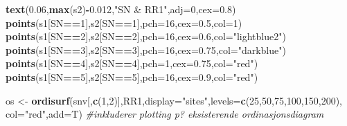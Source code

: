 \documentclass[]{article}
\newenvironment{Shaded}{\begin{snugshade}}{\end{snugshade}}
\newcommand{\CommentTok}[1]{\textcolor[rgb]{0.56,0.35,0.01}{\textit{#1}}}
\newcommand{\DataTypeTok}[1]{\textcolor[rgb]{0.13,0.29,0.53}{#1}}
\newcommand{\DecValTok}[1]{\textcolor[rgb]{0.00,0.00,0.81}{#1}}
\newcommand{\FloatTok}[1]{\textcolor[rgb]{0.00,0.00,0.81}{#1}}
\newcommand{\KeywordTok}[1]{\textcolor[rgb]{0.13,0.29,0.53}{\textbf{#1}}}
\newcommand{\NormalTok}[1]{#1}
\newcommand{\OperatorTok}[1]{\textcolor[rgb]{0.81,0.36,0.00}{\textbf{#1}}}
\newcommand{\StringTok}[1]{\textcolor[rgb]{0.31,0.60,0.02}{#1}}
\begin{document}
\begin{Shaded}
\begin{Highlighting}[]
\KeywordTok{text}\NormalTok{(}\FloatTok{0.06}\NormalTok{,}\KeywordTok{max}\NormalTok{(s2)}\OperatorTok{-}\FloatTok{0.012}\NormalTok{,}\StringTok{"SN & RR1"}\NormalTok{,}\DataTypeTok{adj=}\DecValTok{0}\NormalTok{,}\DataTypeTok{cex=}\FloatTok{0.8}\NormalTok{)}
\KeywordTok{points}\NormalTok{(s1[SN}\OperatorTok{==}\DecValTok{1}\NormalTok{],s2[SN}\OperatorTok{==}\DecValTok{1}\NormalTok{],}\DataTypeTok{pch=}\DecValTok{16}\NormalTok{,}\DataTypeTok{cex=}\FloatTok{0.5}\NormalTok{,}\DataTypeTok{col=}\DecValTok{1}\NormalTok{)}
\KeywordTok{points}\NormalTok{(s1[SN}\OperatorTok{==}\DecValTok{2}\NormalTok{],s2[SN}\OperatorTok{==}\DecValTok{2}\NormalTok{],}\DataTypeTok{pch=}\DecValTok{16}\NormalTok{,}\DataTypeTok{cex=}\FloatTok{0.6}\NormalTok{,}\DataTypeTok{col=}\StringTok{"lightblue2"}\NormalTok{)}
\KeywordTok{points}\NormalTok{(s1[SN}\OperatorTok{==}\DecValTok{3}\NormalTok{],s2[SN}\OperatorTok{==}\DecValTok{3}\NormalTok{],}\DataTypeTok{pch=}\DecValTok{16}\NormalTok{,}\DataTypeTok{cex=}\FloatTok{0.75}\NormalTok{,}\DataTypeTok{col=}\StringTok{"darkblue"}\NormalTok{)}
\KeywordTok{points}\NormalTok{(s1[SN}\OperatorTok{==}\DecValTok{4}\NormalTok{],s2[SN}\OperatorTok{==}\DecValTok{4}\NormalTok{],}\DataTypeTok{pch=}\DecValTok{1}\NormalTok{,}\DataTypeTok{cex=}\FloatTok{0.75}\NormalTok{,}\DataTypeTok{col=}\StringTok{"red"}\NormalTok{)}
\KeywordTok{points}\NormalTok{(s1[SN}\OperatorTok{==}\DecValTok{5}\NormalTok{],s2[SN}\OperatorTok{==}\DecValTok{5}\NormalTok{],}\DataTypeTok{pch=}\DecValTok{16}\NormalTok{,}\DataTypeTok{cex=}\FloatTok{0.9}\NormalTok{,}\DataTypeTok{col=}\StringTok{"red"}\NormalTok{)}

\NormalTok{os <-}\StringTok{ }\KeywordTok{ordisurf}\NormalTok{(snv[,}\KeywordTok{c}\NormalTok{(}\DecValTok{1}\NormalTok{,}\DecValTok{2}\NormalTok{)],RR1,}\DataTypeTok{display=}\StringTok{"sites"}\NormalTok{,}\DataTypeTok{levels=}\KeywordTok{c}\NormalTok{(}\DecValTok{25}\NormalTok{,}\DecValTok{50}\NormalTok{,}\DecValTok{75}\NormalTok{,}\DecValTok{100}\NormalTok{,}\DecValTok{150}\NormalTok{,}\DecValTok{200}\NormalTok{), }\DataTypeTok{col=}\StringTok{"red"}\NormalTok{,}\DataTypeTok{add=}\NormalTok{T) }\CommentTok{#inkluderer plotting p? eksisterende ordinasjonsdiagram}
\end{Highlighting}
\end{Shaded}
\end{document}
